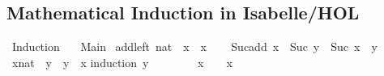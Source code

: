 %
\begin{isabellebody}%
%
%
\begin{isamarkuptext}%
\section*{Mathematical Induction in Isabelle/HOL}%
\end{isamarkuptext}\isamarkuptrue%
%
\isadelimtheory
%
\endisadelimtheory
%
\isatagtheory
{}\isamarkupfalse%
\ Induction\isanewline
\ \ \ Main\isanewline
{}%
\endisatagtheory
{\isafoldtheory}%
%
\isadelimtheory
%
\endisadelimtheory
\isanewline
\isanewline
{}\isamarkupfalse%
\ add{\isacharunderscore}{\kern0pt}{}{\isacharunderscore}{\kern0pt}left{\isacharcolon}{\kern0pt}\ {\isachardoublequoteopen}{\isacharparenleft}{\kern0pt}{}{\isacharcolon}{\kern0pt}{\isacharcolon}{\kern0pt}nat{\isacharparenright}{\kern0pt}\ {\isacharplus}{\kern0pt}\ x\ {\isacharequal}{\kern0pt}\ x{\isachardoublequoteclose}\isanewline
%
\isadelimproof
\ \ %
\endisadelimproof
%
\isatagproof
{}\isamarkupfalse%
%
\endisatagproof
{\isafoldproof}%
%
\isadelimproof
\isanewline
%
\endisadelimproof
\isanewline
{}\isamarkupfalse%
\ Suc{\isacharunderscore}{\kern0pt}add{\isacharunderscore}{\kern0pt}{}{\isacharcolon}{\kern0pt}\ {\isachardoublequoteopen}x\ {\isacharplus}{\kern0pt}\ Suc\ y\ {\isacharequal}{\kern0pt}\ Suc\ {\isacharparenleft}{\kern0pt}x\ {\isacharplus}{\kern0pt}\ y{\isacharparenright}{\kern0pt}{\isachardoublequoteclose}\isanewline
%
\isadelimproof
\ \ %
\endisadelimproof
%
\isatagproof
{}\isamarkupfalse%
%
\endisatagproof
{\isafoldproof}%
%
\isadelimproof
\isanewline
%
\endisadelimproof
\isanewline
\isanewline
{}\isamarkupfalse%
\ {\isachardoublequoteopen}{\isacharparenleft}{\kern0pt}x{\isacharcolon}{\kern0pt}{\isacharcolon}{\kern0pt}nat{\isacharparenright}{\kern0pt}\ {\isacharplus}{\kern0pt}\ y\ {\isacharequal}{\kern0pt}\ y\ {\isacharplus}{\kern0pt}\ x{\isachardoublequoteclose}\isanewline
%
\isadelimproof
%
\endisadelimproof
%
\isatagproof
{}\isamarkupfalse%
{\isacharparenleft}{\kern0pt}induction\ y{\isacharparenright}{\kern0pt}\isanewline
\ \ \isamarkupfalse%
\ {}\isanewline
\ \ \isamarkupfalse%
\ {\isachardoublequoteopen}x\ {\isacharplus}{\kern0pt}\ {}\ {\isacharequal}{\kern0pt}\ x{\isachardoublequoteclose}\isanewline
\ \ \ \ \isamarkupfalse%

\end{isabellebody}
